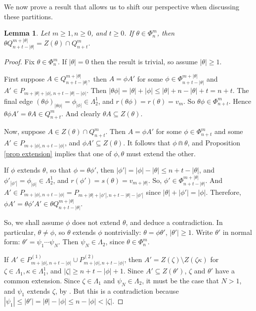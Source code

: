 \documentclass[12pt]{amsart}
\newcommand{\sm}{\setminus}
\newcommand{\sse}{\subseteq}
\newcommand{\ze}{\zeta}
\renewcommand{\th}{\theta}
\newcommand{\ka}{\kappa}
\newcommand{\La}{\Lambda}
\theoremstyle{plain} %
\newtheorem{Lemma}[Theorem]{Lemma}
\theoremstyle{definition} %
\begin{document}
We now prove a result that allows us to shift our perspective when discussing these partitions.

\begin{Lemma}\label{lem equiv of Qs}
    Let $m \geq 1, n \geq 0$, and $t \ge 0$. If $\th \in \Phi_n^m$, then $\th Q_{n+t-|\th|}^{m+|\th|} = Z(\th) \cap Q_{n+t}^m$. 
\end{Lemma}

\begin{proof}
    Fix $\th \in \Phi_n^m$. If $|\th|=0$ then the result is trivial, so assume $|\th|\geq 1$.
    
    First suppose $A \in Q_{n+t-|\th|}^{m+|\th|},$ then $A = \phi A'$ for some $\phi \in \Phi_{n+t-|\th|}^{m+|\th|}$ and $A' \in P_{m+|\th|+|\phi|, n+t-|\th| - |\phi|}$. Then $|\th \phi| = |\th| + |\phi| \leq |\th| + n - |\th| + t = n+t$. The final edge $(\th \phi)_{|\th\phi|} = \phi_{|\phi|} \in \La_2^1$, and $r(\th\phi) = r(\th) = v_m$. So $\th\phi \in \Phi^m_{n+t}$. Hence $\th\phi A' = \th A \in Q_{n+t}^m$. And clearly $\th A \sse Z(\th) $.

    Now, suppose $A \in Z(\th) \cap Q_{n+t}^m$. Then $A = \phi A'$ for some $\phi \in \Phi_{n+t}^m$ and some $A' \in P_{m+|\phi|, n+t-|\phi|}$, and $\phi A' \sse Z(\th)$. It follows that $\phi \Cap \th$, and Proposition \ref{prop extension} implies that one of $\phi, \th$ must extend the other. 
    
    If $\phi$ extends $\th$, so that $\phi = \th \phi'$, then $|\phi'| = |\phi| - |\th| \leq n+t - |\th|$, and $\phi'_{|\phi'|} = \phi_{|\phi|} \in \La_2^1$, and $r(\phi') = s(\th) = v_{m+|\th|}$. So, $\phi' \in \Phi_{n+t-|\th|}^{m+|\th|}$. And $A' \in P_{m+|\phi|, n+t-|\phi|} = P_{m+|\th|+|\phi'|, n+t - |\th| - |\phi'|}$ since $|\th| + |\phi'| = |\phi|$. Therefore, $\phi A' = \th \phi' A' \in \th Q_{n+t-|\th|}^{m+|\th|}$.

    So, we shall assume $\phi$ does not extend $\th$, and deduce a contradiction. In particular, $\th \neq \phi$, so $\th$ extends $\phi$ nontrivially: $\th = \phi \th'$, $|\th'| \geq 1$. Write $\th'$ in normal form: $\th' = \psi_1 \cdots \psi_N$. Then $\psi_N \in \La_2$, since $\th \in \Phi_n^m$.

    If $A' \in P^{(1)}_{m+|\phi|, n+t-|\phi|} \cup P^{(2)}_{m+|\phi|, n+t-|\phi|}$, then $A' = Z(\ze) \sm Z(\ze \ka)$ for $\ze \in \La_1, \ka \in \La_1^1$, and $|\ze| \geq n+t-|\phi|+1$. Since $A' \sse Z(\th')$, $\ze$ and $\th'$ have a common extension. Since $\ze \in \La_1$ and $\psi_N \in \La_2$, it must be the case that $N > 1$, and $\psi_1$ extends $\ze$, by \cite[Lemma 3.4]{MS22}. But this is a contradiction because $|\psi_1| \leq |\th'| = |\th| - |\phi| \leq n-|\phi| < |\ze|$.


\end{proof}
\end{document}
